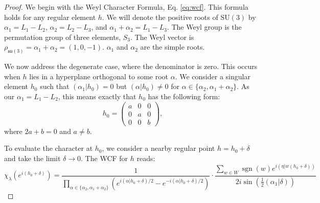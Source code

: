 \documentclass[10pt,a4paper]{amsart}
\DeclareMathOperator{\sgn}{sgn}
\newcommand{\su}{\mathfrak{su}}
\begin{document}
\begin{proof}


We begin with the Weyl Character Formula, Eq. \eqref{eq:wcf}. This formula holds for any regular element $h$. We will denote the positive roots of SU$(3)$ by $\alpha_1 = L_1 - L_2$, $\alpha_2 = L_2 - L_3$, and $\alpha_1 + \alpha_2 = L_1 - L_3$. The Weyl group is the permutation group of three elements, $S_3$. The Weyl vector is $\rho_{\su(3)} = \alpha_1 + \alpha_2 = (1,0,-1)$. $\alpha_1$ and $\alpha_2$ are the simple roots.

We now address the degenerate case, where the denominator is zero. This occurs when $h$ lies in a hyperplane orthogonal to some root $\alpha$. We consider a singular element $h_0$ such that $(\alpha_1|h_0) = 0$ but $(\alpha|h_0) \neq 0$ for $\alpha \in \{\alpha_2, \alpha_1+\alpha_2\}$. As our $\alpha_1 = L_1 - L_2$, this means exactly that $h_0$ has the following form:
\[
h_0 = \begin{pmatrix}
    a & 0 & 0 \\
    0 & a & 0 \\
    0 & 0 & b
\end{pmatrix},
\]
where $2a+b=0$ and $a \neq b$.

To evaluate the character at $h_0$, we consider a nearby regular point $h = h_0 + \delta$ and take the limit $\delta \to 0$. The WCF for $h$ reads:
\begin{equation}
    \chi_\lambda(e^{i(h_0+\delta)}) = \frac{1}{\prod_{\alpha \in \{\alpha_2, \alpha_1+\alpha_2\}} \left(e^{i(\alpha|h_0+\delta)/2} - e^{-i(\alpha|h_0+\delta)/2}\right)} \cdot \frac{\sum_{w \in W} \sgn(w) e^{i(\eta|w(h_0+\delta))}}{2i\sin\left(\frac{1}{2}(\alpha_1|\delta)\right)}
\end{equation}


\end{proof}
\end{document}
